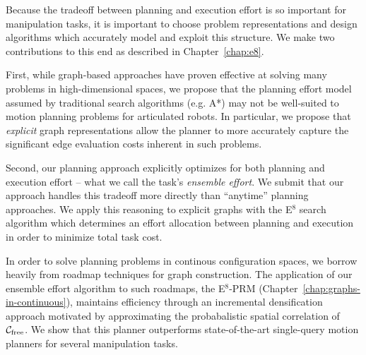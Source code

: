 Because the tradeoff between planning and execution effort
is so important for manipulation tasks,
it is important to choose problem representations and design algorithms
which accurately model and exploit this structure.
We make two contributions to this end
as described in Chapter~\ref{chap:e8}.

First,
while graph-based approaches have proven effective at solving
many problems in high-dimensional spaces,
we propose that the planning effort model assumed by
traditional search algorithms (e.g. A*)
may not be well-suited to motion planning problems for articulated
robots.
In particular,
we propose that \emph{explicit} graph representations
allow the planner to more accurately capture the significant
edge evaluation costs inherent in such problems.

Second,
our planning approach explicitly optimizes for both planning
and execution effort
-- what we call the task's \emph{ensemble effort}.
We submit that our approach handles this tradeoff more directly
than ``anytime'' planning approaches.
We apply this reasoning to explicit graphs
with the E$^8$ search algorithm
which determines an effort allocation between planning and execution
in order to minimize total task cost.

In order to solve planning problems in continous configuration spaces,
we borrow heavily from roadmap techniques for graph construction.
The application of our ensemble effort algorithm to such roadmaps,
the E$^8$-PRM (Chapter~\ref{chap:graphs-in-continuous}),
maintains efficiency through an
incremental densification approach
motivated by approximating the probabalistic spatial correlation of
$\mathcal{C}_{\mbox{\scriptsize free}}$.
We show that this planner outperforms state-of-the-art
single-query motion planners for several manipulation tasks.


